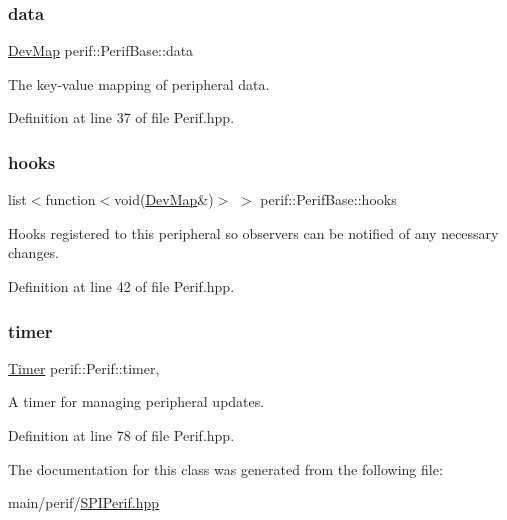 \subsubsection{\texorpdfstring{data}{data}}
{\footnotesize\ttfamily \mbox{\hyperlink{Perif_8hpp_a358ff4ee6d24694ee7661f0cce14377e}{Dev\+Map}} perif\+::\+Perif\+Base\+::data\hspace{0.3cm}{\ttfamily [inherited]}}

The key-\/value mapping of peripheral data. 

Definition at line 37 of file Perif.\+hpp.

\mbox{\label{classperif_1_1PerifBase_a98964e5ca8384df64881265e0aa6d7b6}} 
\subsubsection{\texorpdfstring{hooks}{hooks}}
{\footnotesize\ttfamily list$<$function$<$void(\mbox{\hyperlink{Perif_8hpp_a358ff4ee6d24694ee7661f0cce14377e}{Dev\+Map}}\&)$>$ $>$ perif\+::\+Perif\+Base\+::hooks\hspace{0.3cm}{\ttfamily [inherited]}}

Hooks registered to this peripheral so observers can be notified of any necessary changes. 

Definition at line 42 of file Perif.\+hpp.

\mbox{\label{classperif_1_1Perif_acfa1256201bead82ccce1a0a8bcc24e1}} 
\subsubsection{\texorpdfstring{timer}{timer}}
{\footnotesize\ttfamily \mbox{\hyperlink{classTimer}{Timer}} perif\+::\+Perif\+::timer\hspace{0.3cm}{\ttfamily [protected]}, {\ttfamily [inherited]}}

A timer for managing peripheral updates. 

Definition at line 78 of file Perif.\+hpp.



The documentation for this class was generated from the following file\+:\begin{DoxyCompactItemize}
\item 
main/perif/\mbox{\hyperlink{SPIPerif_8hpp}{S\+P\+I\+Perif.\+hpp}}\end{DoxyCompactItemize}

